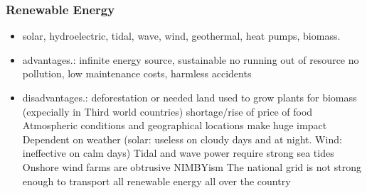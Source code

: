 \documentclass[a5paper,12pt,twoside,titlepage]{scrartcl}
\begin{document}
	\subsubsection{Renewable Energy}

		\begin{itemize}
			\item solar, hydroelectric, tidal, wave, wind, geothermal, heat pumps, biomass.
			\item advantages.: 
			\subitem infinite energy source, \textrightarrow sustainable \textrightarrow no running out of resource
			\subitem no pollution, low maintenance costs, harmless accidents
			\item disadvantages.:
			\subitem deforestation or needed land used to grow plants for biomass (expecially in Third world countries) \textrightarrow shortage/rise of price of food
			\subitem Atmospheric conditions and geographical locations make huge impact
			\subitem Dependent on weather (solar: useless on cloudy days and at night. Wind: ineffective on calm days) 
			\subitem Tidal and wave power require strong sea tides
			\subitem Onshore wind farms are obtrusive
			\subitem NIMBYism
			\subitem The national grid is not strong enough to transport all renewable energy all over the country
		\end{itemize}
\end{document}
